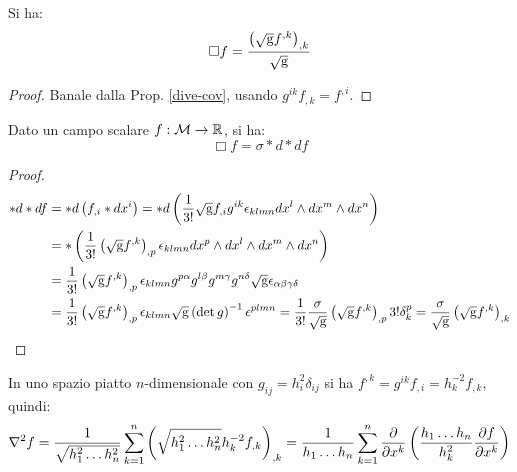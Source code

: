 
\begin{proposition}
	Si ha:
	\begin{equation}
		\Box f = \frac{\left( \sqrt{\mathrm{g}} f^{,k} \right)_{,k}}{\sqrt{\mathrm{g}}}
		\label{eq:4.26}
	\end{equation}
\end{proposition}
\begin{proof}
	Banale dalla Prop. \ref{dive-cov}, usando $ g^{ik} f_{,k} = f^{,i} $.
\end{proof}

\begin{proposition}
	Dato un campo scalare $ f : \mathcal{M} \rightarrow \mathbb{R} $, si ha:
	\begin{equation}
		\Box f = \sigma * d * df
		\label{eq:4.27}
	\end{equation}
\end{proposition}
\begin{proof}
	\begin{equation*}
		\begin{split}
			*d*df
			&= *d \left( f_{,i} *dx^i \right) = *d \left( \frac{1}{3!} \sqrt{\mathrm{g}} f_{,i} g^{ik} \epsilon_{klmn} dx^l \wedge dx^m \wedge dx^n \right)\\
			&= * \left( \frac{1}{3!} \left( \sqrt{\mathrm{g}} f^{,k} \right)_{,p} \epsilon_{klmn} dx^p \wedge dx^l \wedge dx^m \wedge dx^n \right)\\
			&= \frac{1}{3!} \left( \sqrt{\mathrm{g}} f^{,k} \right)_{,p} \epsilon_{klmn} g^{p \alpha} g^{l \beta} g^{m \gamma} g^{n \delta} \sqrt{\mathrm{g}} \epsilon_{\alpha \beta \gamma \delta}\\
			&= \frac{1}{3!} \left( \sqrt{\mathrm{g}} f^{,k} \right)_{,p} \epsilon_{klmn} \sqrt{\mathrm{g}} \left( \det g \right)^{-1} \epsilon^{plmn} = \frac{1}{3!} \frac{\sigma}{\sqrt{\mathrm{g}}} \left( \sqrt{\mathrm{g}} f^{,k} \right)_{,p} 3! \delta^p_k = \frac{\sigma}{\sqrt{\mathrm{g}}} \left( \sqrt{\mathrm{g}} f^{,k} \right)_{,k}
		\end{split}
	\end{equation*}
\end{proof}

\begin{example}
	In uno spazio piatto $ n $-dimensionale con $ g_{ij} = h_i^2 \delta_{ij} $ si ha $ f^{,k} = g^{ik} f_{,i} = h_k^{-2} f_{,k} $, quindi:
	\begin{equation*}
		\nabla^2 f = \frac{1}{\sqrt{h_1^2 \dots h_n^2}} \sum_{k = 1}^{n} \left( \sqrt{h_1^2 \dots h_n^2} h_k^{-2} f_{,k} \right)_{,k} = \frac{1}{h_1 \dots h_n} \sum_{k = 1}^{n} \frac{\partial}{\partial x^k} \left( \frac{h_1 \dots h_n}{h_k^2} \frac{\partial f}{\partial x^k} \right)
	\end{equation*}
\end{example}

